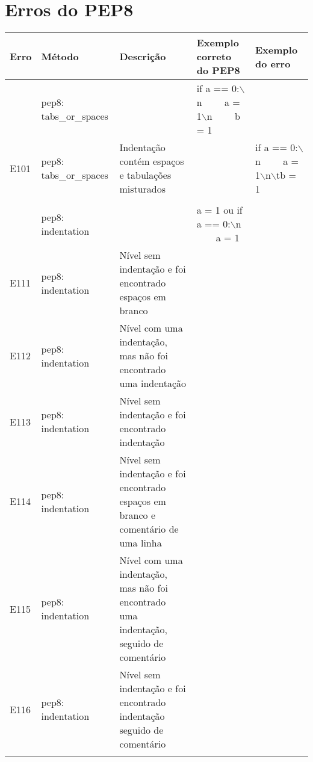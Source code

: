 \chapter{Erros do PEP8}
	\begin{landscape}
		\begin{table}
			\scriptsize
			\begin{tabularx}{\linewidth}{ |p{1cm}|p{4cm}|p{7cm}|X|X|}
				\hline
				\textbf{Erro}
				& \textbf{Método}
				& \textbf{Descrição}
				& \textbf{Exemplo correto do PEP8}
				& \textbf{Exemplo do erro} \\
				\hline
				& pep8: tabs\_or\_spaces
				&  
				& if a == 0:$\backslash$n \ \ \ \ a = 1$\backslash$n \ \ \ \ b = 1
				&  \\
				\hline
				E101
				& pep8: tabs\_or\_spaces
				& Indentação contém espaços e tabulações misturados
				&  
				& if a == 0:$\backslash$n \ \ \ \ a = 1$\backslash$n$\backslash$tb = 1 \\
				\hline
				
				&  
				&  
				&  
				&  \\
				\hline
				
				& pep8: indentation
				&  
				& a = 1 ou if a == 0:$\backslash$n \ \ \ \ a = 1
				&  \\
				\hline
				E111
				& pep8: indentation
				& Nível sem indentação e foi encontrado espaços em branco
				&  
				&  \\
				\hline
				E112
				& pep8: indentation
				& Nível com uma indentação, mas não foi encontrado uma indentação
				&  
				&  \\
				\hline
				E113
				& pep8: indentation
				& Nível sem indentação e foi encontrado indentação
				&  
				&  \\
				\hline
				E114
				& pep8: indentation
				& Nível sem indentação e foi encontrado espaços em branco e comentário de uma linha
				&  
				&  \\
				\hline
				E115
				& pep8: indentation
				& Nível com uma indentação, mas não foi encontrado uma indentação, seguido de comentário
				&  
				&  \\
				\hline
				E116
				& pep8: indentation
				& Nível sem indentação e foi encontrado indentação seguido de comentário
				&  
				&  \\
				\hline
				
				&  
				&  
				&  
				&  \\
				\hline
				

\end{tabularx}
\end{table}
\end{landscape}
